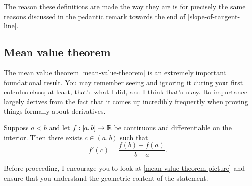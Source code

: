 \begin{pedanticremark}
	The reason these definitions are made the way they are is for precisely the same reasons discussed in the pedantic remark towards the end of \cref{slope-of-tangent-line}. 
\end{pedanticremark}

\subsection{Mean value theorem}

The mean value theorem \ref{mean-value-theorem} is an extremely important foundational result. You may remember seeing and ignoring it during your first calculus class; at least, that's what I did, and I think that's okay. Its importance largely derives from the fact that it comes up incredibly frequently when proving things formally about derivatives. 

\begin{theorem}  \label{mean-value-theorem}
	Suppose $a < b$ and let $f : [a, b] \to \mathbb{R}$ be continuous and differentiable on the interior. Then there exists $c \in (a, b)$ such that
	\[ f'(c) = \frac{f(b) - f(a)}{b-a}. \]
\end{theorem}

Before proceeding, I encourage you to look at \cref{mean-value-theorem-picture} and ensure that you understand the geometric content of the statement. 

